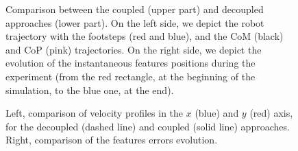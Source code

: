 \begin{figure}[ht]
 \caption{\label{Fig:Comparisons-approaches} Comparison between the coupled (upper part) and decoupled approaches (lower part). On the left side, we depict the robot trajectory with the footsteps (red and blue), and the CoM (black) and CoP (pink) trajectories. On the right side, we depict the evolution of the instantaneous features positions during the experiment (from the red rectangle, at the beginning of the simulation, to the blue one, at the end).}
 \end{figure}

\begin{figure}[ht]
 \centering
 \caption{\label{Fig:Comparisons-velocitieserrors} Left, comparison of velocity profiles in the $x$ (blue) and $y$ (red) axis, for the decoupled (dashed line) and coupled (solid line) approaches. Right, comparison of the features errors evolution.}
 \end{figure}

